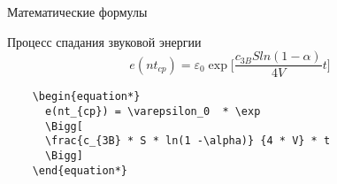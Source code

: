 \begin{frame}[fragile]{Математические формулы}
  \begin{flushleft}
    \Large
    Процесс спадания звуковой энергии
    \begin{equation*}
      e(nt_{cp}) = \varepsilon_0 \exp\Bigg[ \frac{c_{3B} S ln(1 -
        \alpha)}{4V}t \Bigg]
    \end{equation*}
  \end{flushleft}
  \pause
  \begin{verbatim}
    \begin{equation*}
      e(nt_{cp}) = \varepsilon_0  * \exp
      \Bigg[
      \frac{c_{3B} * S * ln(1 -\alpha)} {4 * V} * t
      \Bigg]
    \end{equation*}
  \end{verbatim}
\end{frame}
